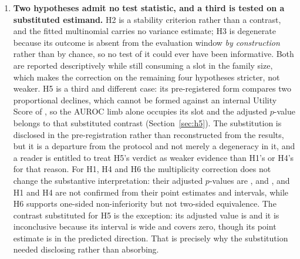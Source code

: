 \begin{enumerate}
    \item \textbf{Two hypotheses admit no test statistic, and a third is tested
    on a substituted estimand.} H2 is a stability criterion rather than a
    contrast, and the fitted multinomial carries no variance estimate; H3 is
    degenerate because its outcome is absent from the evaluation window
    \emph{by construction} rather than by chance, so no test of it could ever
    have been informative. Both are reported descriptively while still
    consuming a slot in the family size, which makes the correction on the
    remaining four hypotheses stricter, not weaker. H5 is a third and different
    case: its pre-registered form compares two proportional declines, which
    cannot be formed against an internal Utility Score of
    \pcUtilityMaxPrimaryB, so the AUROC limb alone occupies its slot and the
    adjusted $p$-value belongs to that substituted contrast
    (Section~\ref{sec:h5}). The substitution is disclosed in the pre-registration
    rather than reconstructed from the results, but it is a departure from the
    protocol and not merely a degeneracy in it, and a reader is entitled to
    treat H5's verdict as weaker evidence than H1's or H4's for that reason.
    For H1, H4 and H6 the multiplicity correction does not change the
    substantive interpretation: their adjusted $p$-values are \pcHOnePHolm,
    \pcHFourPHolm{} and \pcHSixPHolm, and H1 and H4 are not confirmed from
    their point estimates and intervals, while H6 supports one-sided
    non-inferiority but not two-sided equivalence. The contrast substituted for H5 is the
    exception: its adjusted value is \pcHFivePHolm{} and it is inconclusive
    because its interval is wide and covers zero, though its point estimate is
    in the predicted direction. That is precisely why the substitution needed
    disclosing rather than absorbing.
\end{enumerate}
